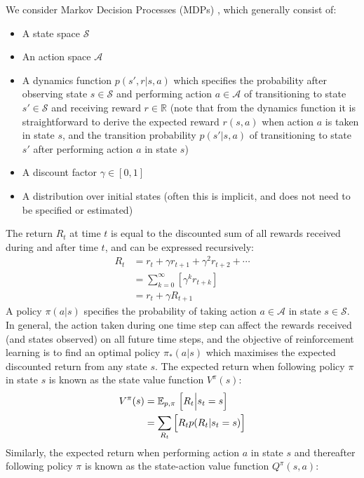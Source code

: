 We consider Markov Decision Processes (MDPs) \cite{sutton2018reinforcement}, which generally consist of:
\begin{itemize}
    \item A state space $\mathcal{S}$
    \item An action space $\mathcal{A}$
    \item A dynamics function $p(s', r \vert s, a)$ which specifies the probability after observing state $s\in\mathcal{S}$ and performing action $a\in\mathcal{A}$ of transitioning to state $s'\in\mathcal{S}$ and receiving reward $r\in\mathbb{R}$ (note that from the dynamics function it is straightforward to derive the expected reward $r(s, a)$ when action $a$ is taken in state $s$, and the transition probability $p(s'\vert s, a)$ of transitioning to state $s'$ after performing action $a$ in state $s$)
    \item A discount factor $\gamma\in[0, 1]$
    \item A distribution over initial states (often this is implicit, and does not need to be specified or estimated)
\end{itemize}
The return $R_t$ at time $t$ is equal to the discounted sum of all rewards received during and after time $t$, and can be expressed recursively:
\begin{align*}
    R_t &= r_t + \gamma r_{t+1} + \gamma^2 r_{t+2} + \cdots \\
    &= \sum_{k = 0}^\infty{\left[ \gamma^k r_{t+k} \right]} \\
    &= r_t + \gamma R_{t+1}
\end{align*}
A policy $\pi(a\vert s)$ specifies the probability of taking action $a\in\mathcal{A}$ in state $s\in\mathcal{S}$. In general, the action taken during one time step can affect the rewards received (and states observed) on all future time steps, and the objective of reinforcement learning is to find an optimal policy $\pi_*(a\vert s)$ which maximises the expected discounted return from any state $s$. The expected return when following policy $\pi$ in state $s$ is known as the state value function $V^\pi(s)$:
\begin{align*}
    V^\pi(s) &= \mathbb{E}_{p, \pi} \left.\Bigl[ R_t \middle\vert s_t=s \Bigr]\right. \\
    &= \sum_{R_t}{\Bigl[ R_t p(R_t\vert s_t=s) \Bigr]}
\end{align*}
Similarly, the expected return when performing action $a$ in state $s$ and thereafter following policy $\pi$ is known as the state-action value function $Q^\pi(s, a)$:
